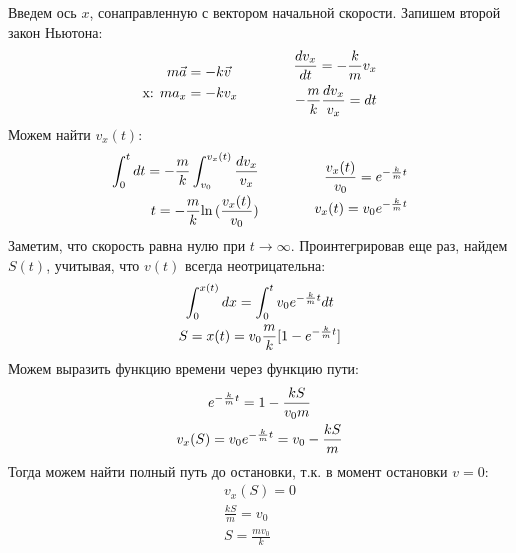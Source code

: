\documentclass[a5paper,10pt]{article}
\begin{document}
Введем ось $x$, сонаправленную с вектором начальной скорости.
Запишем второй закон Ньютона:
\begin{equation*}
    \xdef\km{\frac{k}{m}}\xdef\mk{\frac{m}{k}}\xdef\mgk{\frac{mg}{k}}%
    \begin{aligned}[c]
        m\vec{a}&=-k\vec{v}\\
        \text{x: } ma_x&=-kv_x\\
    \end{aligned}
        \qquad\qquad
    \begin{aligned}[c]
        \frac{dv_x}{dt}=-\km{}v_x\\
        -\mk\frac{dv_x}{v_x}=dt\\
    \end{aligned}
\end{equation*}
Можем найти $v_x(t)$:
\begin{equation*}
    \begin{aligned}[c]
        \int_0^{t}dt=-\mk\int_{v_0}^{v_x(t)}\frac{dv_x}{v_x}\\
        t=-\mk{\ln{(\frac{v_x(t)}{v_0})}}\\
    \end{aligned}
        \qquad\qquad
    \begin{aligned}[c]
        \frac{v_x(t)}{v_0}=e^{-\km{t}}\\
        v_x(t)=v_0e^{-\km{t}}\\
    \end{aligned}
\end{equation*}
Заметим, что скорость равна нулю при $t\rightarrow\infty$.
Проинтегрировав еще раз, найдем $S(t)$, учитывая, что $v(t)$ всегда неотрицательна:
\begin{gather*}
    \int_0^{x(t)} dx = \int_0^t v_0e^{-\km{t}} dt\\
    S=x(t)=v_0\mk{}[1-e^{-\km{t}}]
\end{gather*}
Можем выразить функцию времени через функцию пути:
\begin{gather*}
    e^{-\km{t}}=1-\frac{kS}{v_0m}\\
    v_x(S)=v_0e^{-\km{t}}=v_0-\frac{kS}{m}
\end{gather*}
Тогда можем найти полный путь до остановки, т.к. в момент остановки $v=0$:
\begin{gather*}
    v_x(S)=0\\
    \frac{kS}{m}=v_0\\
    S=\frac{mv_0}{k}  
\end{gather*}
\end{document}

